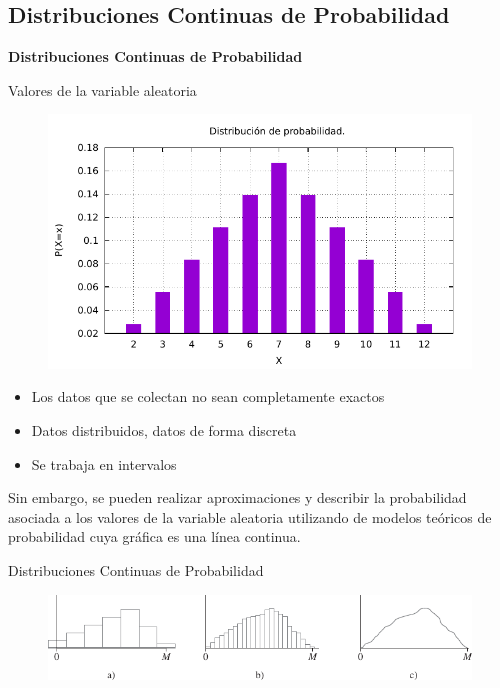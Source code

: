 \documentclass[11pt]{beamer}
\begin{document}
    \subsection*{Distribuciones Continuas de Probabilidad}

      \begin{frame}{}
         \begin{center}
            \textbf{ \huge
               Distribuciones Continuas de Probabilidad}
         \end{center}
      \end{frame}


      \begin{frame}{Valores de la variable aleatoria }
          \begin{figure}
              \centering
              \includegraphics[width=0.5\linewidth]{images/p1}
          \end{figure}
          \pause
          \begin{itemize}
              \item Los datos que se colectan no sean completamente exactos
              \item Datos distribuidos, datos de forma discreta
              \item Se trabaja en intervalos
          \end{itemize}
          \pause
          Sin embargo, se pueden realizar aproximaciones y describir la probabilidad asociada a los valores de la variable aleatoria utilizando de modelos teóricos de probabilidad cuya gráfica es una línea continua.
      \end{frame}

      \begin{frame}{Distribuciones Continuas de Probabilidad}
          \begin{figure}
              \centering
              \includegraphics[width=0.7\linewidth]{images/estadistica10}
              \label{fig:estadistica10}
          \end{figure}

      \end{frame}
\end{document}
